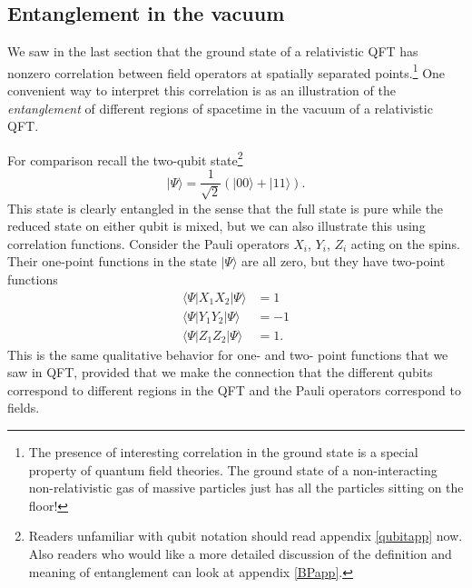 \documentclass[12pt]{article}
\newcommand{\be}{\begin{equation}}
\newcommand{\ee}{\end{equation}}
\newcommand{\lan}{\langle}
\newcommand{\ran}{\rangle}
\begin{document}
\subsection{Entanglement in the vacuum}
We saw in the last section that the ground state of a relativistic QFT has nonzero correlation between field operators at spatially separated points.\footnote{The presence of interesting correlation in the ground state is a special property of quantum field theories.  The ground state of a non-interacting non-relativistic gas of massive particles just has all the particles sitting on the floor!}  One convenient way to interpret this correlation is as an illustration of the \textit{entanglement} of different regions of spacetime in the vacuum of a relativistic QFT.  

For comparison recall the two-qubit state\footnote{Readers unfamiliar with qubit notation should read appendix \ref{qubitapp} now.  Also readers who would like a more detailed discussion of the definition and meaning of entanglement can look at appendix \ref{BPapp}.}
\be
|\Psi\ran=\frac{1}{\sqrt{2}}\left(|00\ran+|11\ran\right).
\ee
This state is clearly entangled in the sense that the full state is pure while the reduced state on either qubit is mixed, but we can also illustrate this using correlation functions.  Consider the Pauli operators $X_i$, $Y_i$, $Z_i$ acting on the spins.  Their one-point functions in the state $|\Psi\ran$ are all zero, but they have two-point functions
\begin{align}\nonumber
\lan\Psi|X_1 X_2|\Psi\ran&=1\\\nonumber
\lan\Psi|Y_1 Y_2|\Psi\ran&=-1\\\nonumber
\lan\Psi|Z_1 Z_2|\Psi\ran&=1.
\end{align}
This is the same qualitative behavior for one- and two- point functions that we saw in QFT, provided that we make the connection that the different qubits correspond to different regions in the QFT and the Pauli operators correspond to fields.  %
\end{document}

